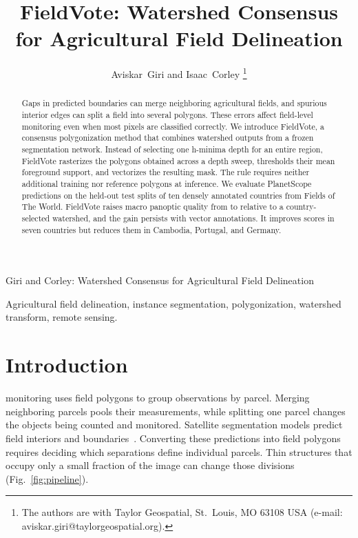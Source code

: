 \documentclass[journal]{IEEEtran}
\begin{document}
\title{FieldVote: Watershed Consensus for Agricultural Field Delineation}
\author{Aviskar~Giri and Isaac~Corley%
\thanks{The authors are with Taylor Geospatial, St.\ Louis, MO 63108 USA
(e-mail: aviskar.giri@taylorgeospatial.org).}}
%
{Giri and Corley: Watershed Consensus for Agricultural Field Delineation}
\maketitle

\begin{abstract}
Gaps in predicted boundaries can merge neighboring agricultural fields, and spurious interior edges can split a field into several polygons.
These errors affect field-level monitoring even when most pixels are classified correctly.
We introduce FieldVote, a consensus polygonization method that combines watershed outputs from a frozen segmentation network.
Instead of selecting one h-minima depth for an entire region, FieldVote rasterizes the polygons obtained across a depth sweep, thresholds their mean foreground support, and vectorizes the resulting mask.
The rule requires neither additional training nor reference polygons at inference.
We evaluate PlanetScope predictions on the held-out test splits of ten densely annotated countries from Fields of The World.
FieldVote raises macro panoptic quality from \BasePQ{} to \VotePQ{} relative to a country-selected watershed, and the gain persists with vector annotations.
It improves scores in seven countries but reduces them in Cambodia, Portugal, and Germany.
\end{abstract}

\begin{IEEEkeywords}
Agricultural field delineation, instance segmentation, polygonization,
watershed transform, remote sensing.
\end{IEEEkeywords}

\section{Introduction}
 monitoring uses field polygons to group observations by parcel.
Merging neighboring parcels pools their measurements, while splitting one parcel changes the objects being counted and monitored.
Satellite segmentation models predict field interiors and boundaries~\cite{kerner2024ftw,waldner2020decode,corley_ftp}.
Converting these predictions into field polygons requires deciding which separations define individual parcels.
Thin structures that occupy only a small fraction of the image can change those divisions (Fig.~\ref{fig:pipeline}).
\end{document}
